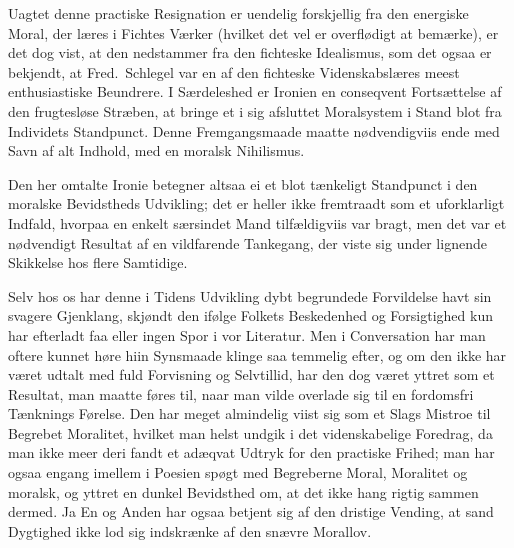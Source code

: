 \documentclass[12pt]{article}
\newcommand{\opage}[1]{\marginnote{\footnotesize\textit{[#1]}}}
\begin{document}
Uagtet denne practiske Resignation er uendelig forskjellig fra \opage{156}den energiske Moral, der læres i Fichtes Værker (hvilket det vel er overflødigt at bemærke), er det dog vist, at den nedstammer fra den fichteske Idealismus, som det ogsaa er bekjendt, at Fred.\ Schlegel var en af den fichteske Videnskabslæres meest enthusiastiske Beundrere. I Særdeleshed er Ironien en conseqvent Fortsættelse af den frugtesløse Stræben, at bringe et i sig afsluttet Moralsystem i Stand blot fra Individets Standpunct. Denne Fremgangsmaade maatte nødvendigviis ende med Savn af alt Indhold, med en moralsk Nihilismus.

Den her omtalte Ironie betegner altsaa ei et blot tænkeligt Standpunct i den moralske Bevidstheds Udvikling; det er heller ikke fremtraadt som et uforklarligt Indfald, hvorpaa en enkelt særsindet Mand tilfældigviis var bragt, men det var et nødvendigt Resultat af en vildfarende Tankegang, der viste sig under lignende Skikkelse hos flere Samtidige.

Selv hos os har denne i Tidens Udvikling dybt begrundede Forvildelse havt sin svagere Gjenklang, skjøndt den ifølge Folkets Beskedenhed og Forsigtighed kun har efterladt faa eller ingen Spor i vor Literatur. Men i Conversation har man oftere kunnet høre hiin Synsmaade klinge saa temmelig efter, og om den ikke har været udtalt med fuld Forvisning og Selvtillid, har den dog været yttret som et Resultat, man maatte føres til, naar man vilde overlade sig til en fordomsfri Tænknings Førelse. Den har meget almindelig viist sig som et Slags Mistroe til Begrebet Moralitet, hvilket man helst undgik i det videnskabelige Foredrag, da man ikke meer deri fandt et adæqvat Udtryk for den practiske Frihed; man har ogsaa engang imellem i Poesien spøgt med Begreberne Moral, Moralitet og moralsk, og yttret en dunkel Bevidsthed om, at det ikke hang rigtig sammen dermed. Ja En og Anden har ogsaa betjent sig af den dristige Vending, at sand Dygtighed ikke lod sig indskrænke af den snævre Morallov.
\end{document}
